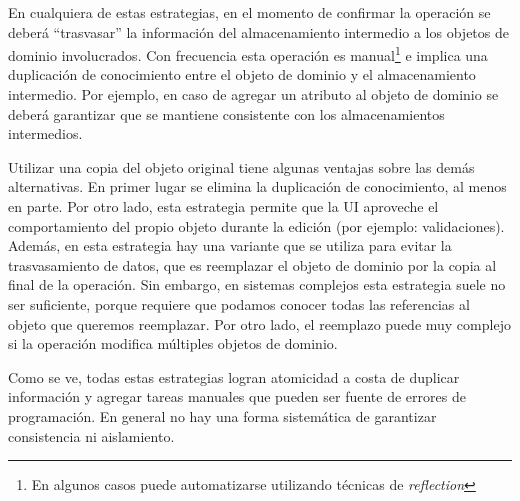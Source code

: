 	En cualquiera de estas estrategias, en el momento de confirmar la operación se
	deberá ``trasvasar'' la información del almacenamiento intermedio a los objetos
	de dominio involucrados.
	Con frecuencia esta operación es manual\footnote{En algunos casos puede automatizarse utilizando
	técnicas de \emph{reflection}} e implica una duplicación de conocimiento entre
	el objeto de dominio y el almacenamiento intermedio. Por ejemplo, en caso de
	agregar un atributo al objeto de dominio se deberá garantizar que se mantiene
	consistente con los almacenamientos intermedios.
	
	Utilizar una copia del objeto original tiene algunas ventajas sobre las demás
	alternativas. En primer lugar se elimina la duplicación de
	conocimiento, al menos en parte. Por otro lado, esta estrategia permite que la
	UI aproveche el comportamiento del propio objeto durante la edición (por
	ejemplo: validaciones). Además, en esta estrategia hay una variante que se
	utiliza para evitar la trasvasamiento de datos, que es reemplazar el objeto de
	dominio por la copia al final de la operación. Sin embargo, en sistemas
	complejos esta estrategia suele no ser suficiente, porque requiere que podamos
	conocer todas las referencias al objeto que queremos reemplazar. Por otro lado,
	el reemplazo puede muy complejo si la operación modifica múltiples objetos de
	dominio.

	Como se ve, todas estas estrategias logran atomicidad a costa de duplicar
	información y agregar tareas manuales que pueden ser fuente de errores de
	programación. En general no hay una forma sistemática de
	garantizar consistencia ni aislamiento.
	